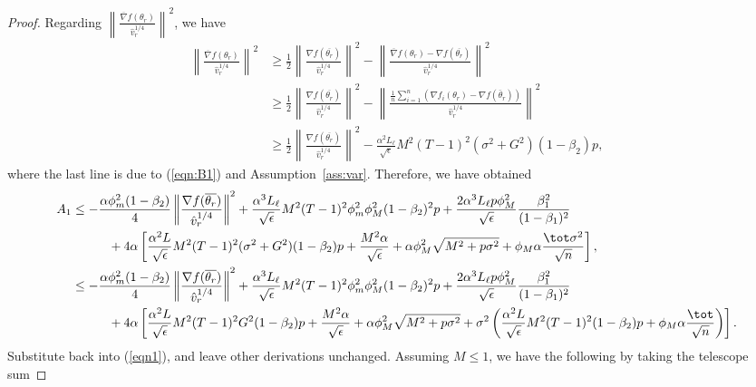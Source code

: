\documentclass[nohyperref]{article}
\theoremstyle{plain}
\theoremstyle{definition}
\theoremstyle{remark}
\begin{document}
\begin{proof}
Regarding $\left\| \frac{\overline{\nabla}f(\theta_r)}{\hat v_r^{1/4}} \right\|^2$, we have
\begin{align*}
\left\| \frac{\overline{\nabla}f(\theta_r)}{\hat v_r^{1/4}} \right\|^2 & \geq \frac{1}{2} \left\| \frac{\nabla f(\overline{\theta_r})}{\hat v_r^{1/4}} \right\|^2 - \left\| \frac{\overline{\nabla}f(\theta_r)- \nabla f(\overline{\theta_r})}{\hat v_r^{1/4}} \right\|^2\\
& \geq \frac{1}{2} \left\| \frac{\nabla f(\overline{\theta_r})}{\hat v_r^{1/4}} \right\|^2 - \left\| \frac{\frac{1}{n}\sum_{i=1}^n (\nabla f_i(\theta_{r})-\nabla f(\bar\theta_r))}{\hat v_r^{1/4}} \right\|^2 \\
&\geq \frac{1}{2} \left\| \frac{\nabla f(\overline{\theta_r})}{\hat v_r^{1/4}} \right\|^2 - \frac{\alpha^2 L_\ell}{\sqrt{\epsilon}} M^2 (T-1)^2 (\sigma^2 + G^2) (1-\beta_2)p,
\end{align*}
where the last line is due to (\ref{eqn:B1}) and Assumption~\ref{ass:var}. Therefore, we have obtained
\begin{align*}
    A_1&\leq -\frac{\alpha\phi_m^2(1-\beta_2)}{4}\left\| \frac{\nabla f(\overline{\theta_r})}{\hat v_r^{1/4}} \right\|^2+\frac{\alpha^3 L_\ell}{\sqrt{\epsilon}} M^2 (T-1)^2 \phi_m^2\phi_M^2 (1-\beta_2)^2p+\frac{2\alpha^3 L_\ell p\phi_M^2}{ \sqrt{\epsilon}}\frac{\beta_1^2}{(1-\beta_1)^2} \\
    &\hspace{0.4in}  + 4\alpha \left[ \frac{\alpha^2 L}{\sqrt{\epsilon}}  M^2 (T-1)^2 (\sigma^2 + G^2) (1-\beta_2)p + \frac{M^2 \alpha }{\sqrt{\epsilon}}+ \alpha \phi_M^2\sqrt{M^2+p\sigma^2} + \phi_M \alpha \frac{\tot \sigma^2}{\sqrt{n}}\right],\\
    &\leq -\frac{\alpha\phi_m^2(1-\beta_2)}{4}\left\| \frac{\nabla f(\overline{\theta_r})}{\hat v_r^{1/4}} \right\|^2+\frac{\alpha^3 L_\ell}{\sqrt{\epsilon}} M^2 (T-1)^2 \phi_m^2\phi_M^2 (1-\beta_2)^2p+\frac{2\alpha^3 L_\ell p\phi_M^2}{ \sqrt{\epsilon}}\frac{\beta_1^2}{(1-\beta_1)^2} \\
    &\hspace{0.4in}  + 4 \alpha\left[ \frac{\alpha^2 L}{\sqrt{\epsilon}}  M^2 (T-1)^2 G^2 (1-\beta_2)p + \frac{M^2 \alpha }{\sqrt{\epsilon}}+ \alpha \phi_M^2\sqrt{M^2+p\sigma^2} + \sigma^2 \left(\frac{\alpha^2 L}{\sqrt{\epsilon}}  M^2 (T-1)^2(1-\beta_2)p+ \phi_M \alpha \frac{\tot }{\sqrt{n}} \right)\right].
\end{align*}
Substitute back into (\ref{eqn1}), and leave other derivations unchanged. Assuming $M\leq 1$, we have the following by taking the telescope sum

\end{proof}
\end{document}
